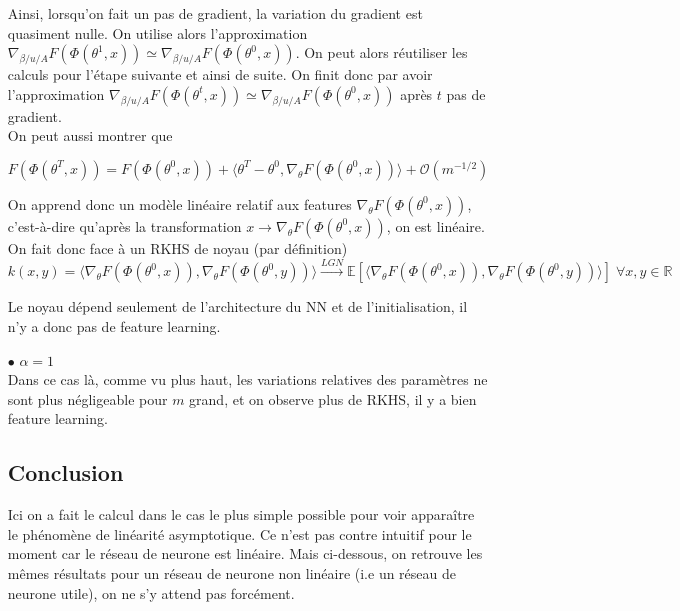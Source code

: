 \documentclass[a4paper, 11pt, french]{article}
\theoremstyle{definition}
\begin{document}
\begin{itemize}
	Ainsi, lorsqu'on fait un pas de gradient, la variation du gradient est quasiment nulle. On utilise alors l'approximation $\nabla_{\beta / u / A} F(\Phi(\theta^1,x)) \simeq \nabla_{\beta / u / A} F(\Phi(\theta^0,x))$. On peut alors réutiliser les calculs pour l'étape suivante et ainsi de suite. On finit donc par avoir l'approximation $\nabla_{\beta / u / A} F(\Phi(\theta^t,x)) \simeq \nabla_{\beta / u / A} F(\Phi(\theta^0,x))$ après $t$ pas de gradient. \\
	
	On peut aussi montrer que 

\[ F(\Phi(\theta^{T}, x)) = F(\Phi(\theta^{0}, x)) + \langle \theta^{T}-\theta^0 , \nabla_{\theta} F(\Phi(\theta^0, x))  \rangle  + \mathcal{O}(m^{-1/2}) \]

	On apprend donc un modèle linéaire relatif aux features $\nabla_{\theta} F(\Phi(\theta^0, x))$, c'est-à-dire qu'après la transformation $x \rightarrow \nabla_{\theta} F(\Phi(\theta^0, x))$, on est linéaire. On fait donc face à un RKHS de noyau (par définition) $$k(x,y)=\langle\nabla_{\theta} F(\Phi(\theta^0, x)),\nabla_{\theta} F(\Phi(\theta^0, y))\rangle \stackrel{LGN}{\longrightarrow} \mathbb{E}[\langle\nabla_{\theta} F(\Phi(\theta^0, x)),\nabla_{\theta} F(\Phi(\theta^0, y))\rangle] \; \forall x,y \in \mathbb{R}$$
	
	Le noyau dépend seulement de l'architecture du NN et de l'initialisation, il n'y a donc pas de feature learning. \\
	
	\item[$\bullet$] $\alpha = 1$ \\

	Dans ce cas là, comme vu plus haut, les variations relatives des paramètres ne sont plus négligeable pour $m$ grand, et on observe plus de RKHS, il y a bien feature learning.
	
	\subsection{Conclusion}
	
	Ici on a fait le calcul dans le cas le plus simple possible pour voir apparaître le phénomène de linéarité asymptotique. Ce n'est pas contre intuitif pour le moment car le réseau de neurone est linéaire. Mais ci-dessous, on retrouve les mêmes résultats pour un réseau de neurone non linéaire (i.e un réseau de neurone utile), on ne s'y attend pas forcément.
		
	\end{itemize}
\end{document}
